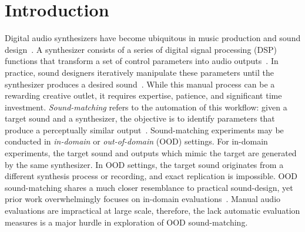 \documentclass[10pt]{article} %
\newcommand{\SIMSESpec}{\texttt{SIMSE\_\allowbreak Spec}\xspace}
\newcommand{\LoneSpec}{\texttt{L1\_\allowbreak Spec}\xspace}
\newcommand{\JTFS}{\texttt{JTFS}\xspace}
\newcommand{\DTWEnv}{\texttt{DTW\_\allowbreak Envelope}\xspace}
\begin{document}
\begin{abstract}
We apply this methodology across seven scenarios involving band-pass filtering, amplitude modulation, and pitch-bending synthesizers, evaluated with four differentiable loss functions (\SIMSESpec, \LoneSpec, \JTFS, \DTWEnv) and validated against blinded human listening tests. Our results confirm that loss function effectiveness remains tightly coupled to the method of synthesis in OOD settings: \SIMSESpec excels at filter cutoff recovery, \DTWEnv consistently recovers amplitude modulation parameters, and \JTFS dominates smooth pitch trajectories. Parameter-based evaluation agrees with hearing tests on the top-ranked loss function in 5 of 7 scenarios, demonstrating utility as a diagnostic tool for identifying loss function capabilities. These findings provide both empirical guidance for selecting similarity measures in practical sound-matching applications and a replicable framework for future OOD experimentation.

\end{abstract}


\section{Introduction}


Digital audio synthesizers have become ubiquitous in music production and sound design~\cite{steinberg1996vst}. A synthesizer consists of a series of digital signal processing (DSP) functions that transform a set of control parameters into audio outputs~\cite{stranneby2004digital}. In practice, sound designers iteratively manipulate these parameters until the synthesizer produces a desired sound~\cite{krekovic2019insights}. While this manual process can be a rewarding creative outlet, it requires expertise, patience, and significant time investment. \textit{Sound-matching} refers to the automation of this workflow: given a target sound and a synthesizer, the objective is to identify parameters that produce a perceptually similar output~\cite{justice1979analytic,horner1993machine,mitchell2007evolutionary}. Sound-matching experiments may be conducted in \textit{in-domain} or \textit{out-of-domain} (OOD) settings. For in-domain experiments, the target sound and outputs which mimic the target are generated by the same synthesizer. In OOD settings, the target sound originates from a different synthesis process or recording, and exact replication is impossible. OOD sound-matching shares a much closer resemblance to practical sound-design, yet prior work overwhelmingly focuses on in-domain evaluations~\cite{horner1993machine,yee2018automatic,han2023perceptual,vahidi2023mesostructures,salimi2025evaluating}. Manual audio evaluations are impractical at large scale, therefore, the lack automatic evaluation measures is a major hurdle in exploration of OOD sound-matching.  
\end{document}
